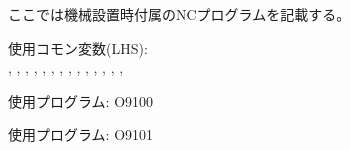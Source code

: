 \setcounter{lstlisting}{0}

ここでは機械設置時付属のNCプログラムを記載する。



\begin{hosoku}
使用コモン変数(LHS):\\
, , , , , , , , , , , , , , 
\end{hosoku}


\clearpage

\begin{hosoku}
使用プログラム: O9100
\end{hosoku}



\begin{hosoku}
使用プログラム: O9101
\end{hosoku}


